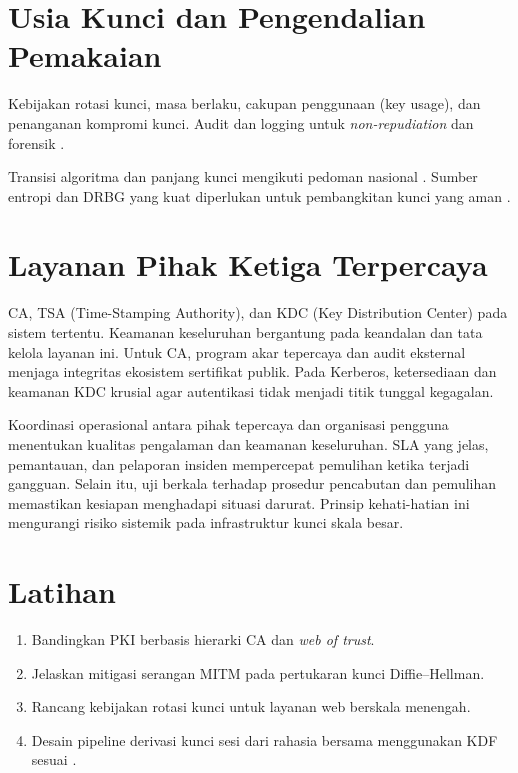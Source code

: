 \documentclass[../main.tex]{subfiles}
\begin{document}
\section{Usia Kunci dan Pengendalian Pemakaian}
Kebijakan rotasi kunci, masa berlaku, cakupan penggunaan (key usage), dan penanganan kompromi kunci. Audit dan logging untuk \emph{non-repudiation} dan forensik \citep{menezes}.

Transisi algoritma dan panjang kunci mengikuti pedoman nasional \citep{nist_sp_800_131a}. Sumber entropi dan DRBG yang kuat diperlukan untuk pembangkitan kunci yang aman \citep{nist_sp_800_90a_r1}.

\section{Layanan Pihak Ketiga Terpercaya}
CA, TSA (Time-Stamping Authority), dan KDC (Key Distribution Center) pada sistem tertentu. Keamanan keseluruhan bergantung pada keandalan dan tata kelola layanan ini. Untuk CA, program akar tepercaya dan audit eksternal menjaga integritas ekosistem sertifikat publik. Pada Kerberos, ketersediaan dan keamanan KDC krusial agar autentikasi tidak menjadi titik tunggal kegagalan.

Koordinasi operasional antara pihak tepercaya dan organisasi pengguna menentukan kualitas pengalaman dan keamanan keseluruhan. SLA yang jelas, pemantauan, dan pelaporan insiden mempercepat pemulihan ketika terjadi gangguan. Selain itu, uji berkala terhadap prosedur pencabutan dan pemulihan memastikan kesiapan menghadapi situasi darurat. Prinsip kehati-hatian ini mengurangi risiko sistemik pada infrastruktur kunci skala besar.

\section{Latihan}
\begin{enumerate}
  \item Bandingkan PKI berbasis hierarki CA dan \emph{web of trust}.
  \item Jelaskan mitigasi serangan MITM pada pertukaran kunci Diffie--Hellman.
  \item Rancang kebijakan rotasi kunci untuk layanan web berskala menengah.
  \item Desain pipeline derivasi kunci sesi dari rahasia bersama menggunakan KDF sesuai \citep{nist_sp_800_56c_r2}.
\end{enumerate}
\end{document}
